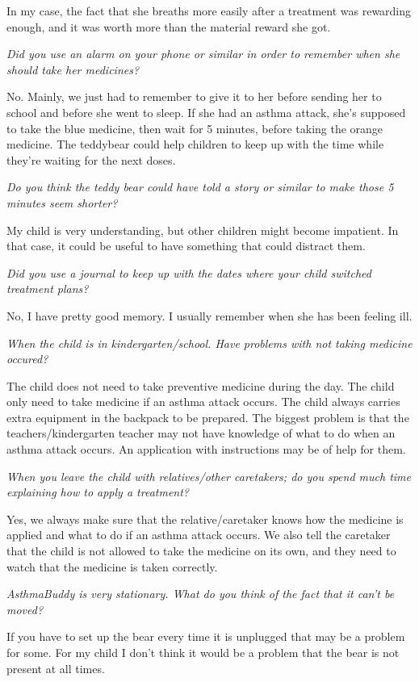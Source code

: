 In my case, the fact that she breaths more easily after a treatment was rewarding enough, and it was worth more than the material reward she got. 

\emph{Did you use an alarm on your phone or similar in order to remember when she should take her medicines?}

No. Mainly, we just had to remember to give it to her before sending her to school and before she went to sleep. 
If she had an asthma attack, she's supposed to take the blue medicine, then wait for 5 minutes, before taking the orange medicine. The teddybear could help children to keep up with the time while they're waiting for the next doses. 

\emph{Do you think the teddy bear could have told a story or similar to make those 5 minutes seem shorter?}

My child is very understanding, but other children might become impatient. In that case, it could be useful to have something that could distract them. 

\emph{Did you use a journal to keep up with the dates where your child switched treatment plans?}

No, I have pretty good memory. I usually remember when she has been feeling ill. 

\emph{When the child is in kindergarten/school. Have problems with not taking medicine occured?}

The child does not need to take preventive medicine during the day. The child only need to take medicine if an asthma attack occurs. The child always carries extra equipment in the backpack to be prepared. The biggest problem is that the teachers/kindergarten teacher may not have knowledge of what to do when an asthma attack occurs. An application with instructions may be of help for them. 


\emph{When you leave the child with relatives/other caretakers; do you spend much time explaining how to apply a treatment?}

Yes, we always make sure that the relative/caretaker knows how the medicine is applied and what to do if an asthma attack occurs. We also tell the caretaker that the child is not allowed to take the medicine on its own, and they need to watch that the medicine is taken correctly. 

\emph{AsthmaBuddy is very stationary. What do you think of the fact that it can't be moved?}

If you have to set up the bear every time it is unplugged that may be a problem for some. For my child I don't think it would be a problem that the bear is not present at all times.

